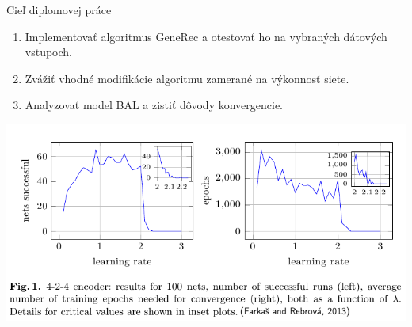 \documentclass[xcolor=dvipsnames]{beamer}
\begin{document}

\begin{frame}{Cieľ diplomovej práce} 
  \begin{enumerate} 
    \item Implementovať algoritmus GeneRec a otestovať ho na vybraných dátových vstupoch. 
    \item Zvážiť vhodné modifikácie algoritmu zamerané na výkonnosť siete. 
    \item Analyzovať model BAL a zistiť dôvody konvergencie. 
  \end{enumerate} 
  
  \begin{center}
    \includegraphics[scale=0.40]{img/bal_performance.png}
  \end{center}  
  
\end{frame} 

\end{document}
